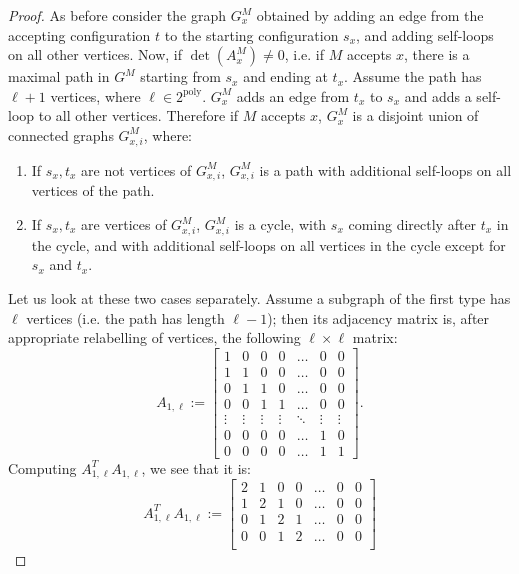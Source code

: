\documentclass[11pt]{article}
\theoremstyle{definition}
\theoremstyle{remark}
\newcommand{\poly}{\mathrm{poly}}
\begin{document}
\begin{proof}
As before consider the graph $G^M_x$ obtained by adding an edge from the accepting configuration $t$ to the starting configuration $s_x$, and adding self-loops on all other vertices. 
Now, if $\det(A^M_x) \neq 0$, i.e. if $M$ accepts $x$, there is a maximal path in $G^M$ starting from $s_x$ and ending at $t_x$. Assume the path has $\ell+1$ vertices, where $\ell \in 2^{\poly}$. $G^M_x$ adds an edge from $t_x$ to $s_x$ and adds a self-loop to all other vertices. Therefore if $M$ accepts $x$, $G^M_x$ is a disjoint union of connected graphs $G^M_{x,i}$, where:
\begin{enumerate}
\item If $s_x, t_x$ are not vertices of $G^M_{x,i}$, $G^M_{x,i}$ is a path with additional self-loops on all vertices of the path.
\item If $s_x, t_x$ are vertices of $G^M_{x,i}$, $G^M_{x,i}$ is a cycle, with $s_x$ coming directly after $t_x$ in the cycle, and with additional self-loops on all vertices in the cycle except for $s_x$ and $t_x$.
\end{enumerate}
Let us look at these two cases separately. Assume a subgraph of the first type has $\ell$ vertices (i.e. the path has length $\ell-1$); then its adjacency matrix is, after appropriate relabelling of vertices, the following $\ell \times \ell$ matrix:
\begin{equation}
A_{1,\ell} := 
\begin{bmatrix}
    1 & 0 & 0 & 0 & \dots  & 0  & 0 \\
    1 & 1 & 0 & 0 &\dots  & 0 & 0 \\
    0 & 1 & 1 & 0 & \dots  & 0 & 0 \\
     0 & 0 & 1 & 1 & \dots  & 0 & 0 \\
    \vdots & \vdots & \vdots & \vdots & \ddots & \vdots & \vdots \\
    0 & 0 & 0 & 0 & \dots  & 1 & 0 \\
    0 & 0 & 0 & 0 & \dots  & 1 & 1
\end{bmatrix}.
\end{equation}
Computing $A_{1,\ell}^T A_{1,\ell}$, we see that it is:
\begin{equation} \label{eq:psd_mat}
A_{1,\ell}^T A_{1,\ell} := 
\begin{bmatrix}
    2 & 1 & 0 & 0 & \dots  & 0  & 0 \\
    1 & 2 & 1 & 0 &\dots  & 0 & 0 \\
    0 & 1 & 2 & 1 & \dots  & 0 & 0 \\
     0 & 0 & 1 & 2 & \dots  & 0 & 0 \\

\end{bmatrix}
\end{equation}
\end{proof}
\end{document}
